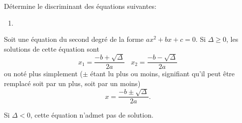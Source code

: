 \begin{exercice}
    Détermine le discriminant des équations suivantes:
    \begin{enumerate}
        \item
    \end{enumerate}
\end{exercice}

\begin{propriete}
    Soit une équation du second degré de la forme $ax^2 + bx + c = 0$. Si $\Delta \geq 0$, les solutions de cette équation sont
    \[
        x_1 = \frac{-b + \sqrt{\Delta}}{2a} \ \ \ \ x_2 = \frac{-b - \sqrt{\Delta}}{2a}
    \]
    ou noté plus simplement ($\pm$ étant lu plus ou moins, signifiant qu'il peut être remplacé soit par un plus, soit par un moins)
    \[
        x = \frac{-b \pm \sqrt{\Delta}}{2a}.
    \]

    Si $\Delta < 0$, cette équation n'admet pas de solution.
\end{propriete}